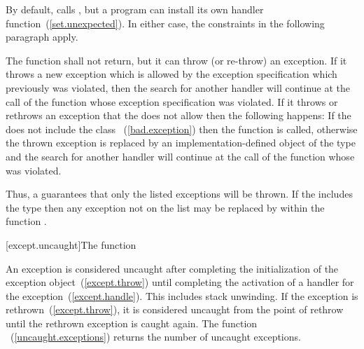 \pnum
\enternote By default,  calls , but a
program can install its own handler function~(\ref{set.unexpected}). In either case, the
constraints in the following paragraph apply. \exitnote

\pnum
The
function shall not return, but it can throw (or re-throw) an exception.
If it throws a new exception which is allowed by the exception specification
which previously was violated, then the search for another handler
will continue at the call of the function whose exception specification was violated.
If it throws or rethrows an exception that the
does not allow
then the following happens:
%
If the
does not include the class
~(\ref{bad.exception})
then the function
is called, otherwise the thrown exception is replaced by an
implementation-defined object of the type
and the search for another handler will continue at the call of the function
whose
was violated.

\pnum
Thus,
a 
guarantees that only the listed exceptions will be thrown.
If the
includes the type
then any exception not on the list may be replaced by
within the function
.

[except.uncaught]{The  function}%

\pnum
An exception is considered uncaught
after completing the initialization of the exception object~(\ref{except.throw})
until completing the activation of a handler for the exception~(\ref{except.handle}).
This includes stack unwinding.
If the exception is rethrown~(\ref{except.throw}),
it is considered uncaught from the point of rethrow
until the rethrown exception is caught again.
The function ~(\ref{uncaught.exceptions})
returns the number of uncaught exceptions.%
